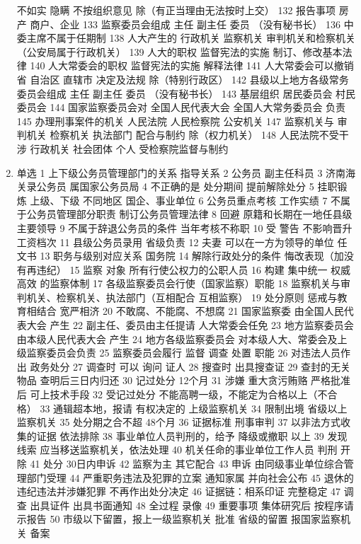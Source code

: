 \documentclass[cyan]{elegantnote}
\begin{document}
\begin{enumerate}
不如实 隐瞒 不按组织意见
除（有正当理由无法按时上交）
132 报告事项
房产 商户、企业
133 监察委员会组成
主任 副主任 委员
（没有秘书长）
136 中委主席不属于任期制
138 人大产生的
行政机关 监察机关 审判机关和检察机关
（公安局属于行政机关）
139 人大的职权
监督宪法的实施
制订、修改基本法律
140 人大常委会的职权
监督宪法的实施
解释法律
141 人大常委会可以撤销
省 自治区 直辖市 决定及法规
除（特别行政区）
142 县级以上地方各级常务委员会组成
主任 副主任 委员
（没有秘书长）
143 基层组织
居民委员会 村民委员会
144 国家监察委员会对
全国人民代表大会 全国人大常务委员会 负责
145 办理刑事案件的机关
人民法院 人民检察院 公安机关
147 监察机关与
审判机关 检察机关 执法部门 配合与制约
除（权力机关）
148 人民法院不受干涉
行政机关 社会团体 个人
受检察院监督与制约
\item 单选
\label{sec:orgec39a53}
1 上下级公务员管理部门的关系 指导关系
2 公务员 副主任科员
3 济南海关录公务员 属国家公务员局
4 不正确的是 处分期间 提前解除处分
5 挂职锻炼 上级、下级 不同地区 国企、事业单位
6 公务员重点考核 工作实绩
7 不属于公务员管理部分职责 制订公务员管理法律
8 回避 原籍和长期在一地任县级主要领导
9 不属于辞退公务员的条件 当年考核不称职
10 受 警告 不影响晋升工资档次
11 县级公务员录用 省级负责
12 夫妻 可以在一方为领导的单位 任文书
13 职务与级别对应关系 国务院
14 解除行政处分的条件 悔改表现（加没有再违纪）
15 监察 对象 所有行使公权力的公职人员
16 构建 集中统一 权威高效 的监察体制
17 各级监察委员会行使（国家监察）职能
18 监察机关与审判机关、检察机关、执法部门（互相配合 互相监察）
19 处分原则 惩戒与教育相结合 宽严相济
20 不敢腐、不能腐、不想腐
21 国家监察委 由全国人民代表大会 产生
22 副主任、委员由主任提请 人大常委会任免
23 地方监察委员会 由本级人民代表大会 产生
24 地方各级监察委员会 对本级人大、常委会及上级监察委员会负责
25 监察委员会履行 监督 调查 处置 职能
26 对违法人员作出 政务处分
27 调查时 可以 询问 证人
28 搜查时 出具搜查证
29 查封的无关物品 查明后三日内归还
30 记过处分 12个月
31 涉嫌 重大贪污贿赂 严格批准后 可上技术手段
32 受记过处分 不能高聘一级，不能定为合格以上（不合格）
33 通辑超本地，报请 有权决定的 上级监察机关
34 限制出境 省级以上监察机关
35 处分期之合不超 48个月
36 证据标准 刑事审判
37 以非法方式收集的证据 依法排除
38 事业单位人员判刑的，给予 降级或撤职 以上
39 发现线索 应当移送监察机关，依法处理
40 机关任命的事业单位工作人员 判刑 开除
41 处分 30日内申诉
42 监察为主 其它配合
43 申诉 由同级事业单位综合管理部门受理
44 严重职务违法及犯罪的立案 通知家属 并向社会公布
45 退休的 违纪违法并涉嫌犯罪 不再作出处分决定
46 证据链：相系印证 完整稳定
47 调查 出具证件 出具书面通知
48 全过程 录像
49 重要事项 集体研究后 按程序请示报告
50 市级以下留置，报上一级监察机关 批准 省级的留置 报国家监察机关 备案

\end{enumerate}
\end{document}
